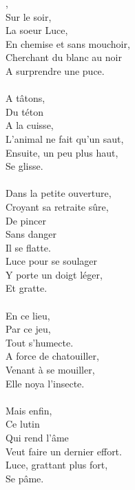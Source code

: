 \vspace{-0.2cm}
,
\\Sur le soir,
\\La soeur Luce,
\\En chemise et sans mouchoir,
\\Cherchant du blanc au noir
\\A surprendre une puce.
\\\\A tâtons,
\\Du téton
\\A la cuisse,
\\L'animal ne fait qu'un saut,
\\Ensuite, un peu plus haut,
\\Se glisse.
\\\\Dans la petite ouverture,
\\Croyant sa retraite sûre,
\\De pincer
\\Sans danger
\\Il se flatte.
\\Luce pour se soulager
\\Y porte un doigt léger,
\\Et gratte.
\\\\En ce lieu,
\\Par ce jeu,
\\Tout s'humecte.
\\A force de chatouiller,
\\Venant à se mouiller,
\\Elle noya l'insecte.
\\\\Mais enfin,
\\Ce lutin
\\Qui rend l'âme
\\Veut faire un dernier effort.
\\Luce, grattant plus fort,
\\Se pâme.

\breakpage